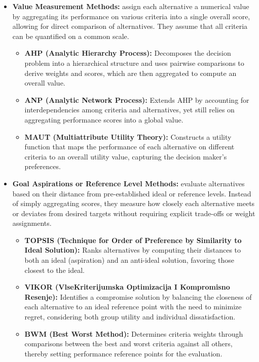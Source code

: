 \begin{itemize}
    \item \textbf{Value Measurement Methods:} assign each alternative a numerical value by aggregating its performance on various criteria into a single overall score, allowing for direct comparison of alternatives. They assume that all criteria can be quantified on a common scale.
    \begin{itemize}
        \item \textbf{AHP (Analytic Hierarchy Process):} Decomposes the decision problem into a hierarchical structure and uses pairwise comparisons to derive weights and scores, which are then aggregated to compute an overall value.
        \item \textbf{ANP (Analytic Network Process):} Extends AHP by accounting for interdependencies among criteria and alternatives, yet still relies on aggregating performance scores into a global value.
        \item \textbf{MAUT (Multiattribute Utility Theory):} Constructs a utility function that maps the performance of each alternative on different criteria to an overall utility value, capturing the decision maker's preferences.
    \end{itemize}
    
    \item \textbf{Goal Aspirations or Reference Level Methods:} evaluate alternatives based on their distance from pre-established ideal or reference levels. Instead of simply aggregating scores, they measure how closely each alternative meets or deviates from desired targets without requiring explicit trade-offs or weight assignments.
    \begin{itemize}
        \item \textbf{TOPSIS (Technique for Order of Preference by Similarity to Ideal Solution):} Ranks alternatives by computing their distances to both an ideal (aspiration) and an anti-ideal solution, favoring those closest to the ideal.
        \item \textbf{VIKOR (VlseKriterijumska Optimizacija I Kompromisno Resenje):}         Identifies a compromise solution by balancing the closeness of each alternative to an ideal reference point with the need to minimize regret, considering both group utility and individual dissatisfaction.
        \item \textbf{BWM (Best Worst Method):} Determines criteria weights through comparisons between the best and worst criteria against all others, thereby setting performance reference points for the evaluation.
    \end{itemize}
    

\end{itemize}
